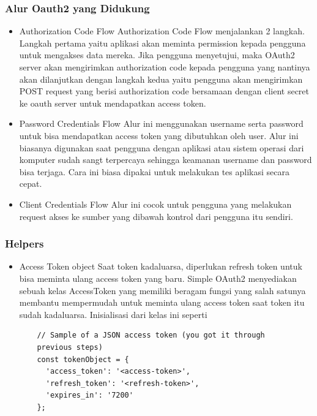 \subsubsection{Alur Oauth2 yang Didukung}
\begin{itemize}
    \item Authorization Code Flow
    Authorization Code Flow menjalankan 2 langkah. Langkah pertama yaitu aplikasi akan meminta permission kepada pengguna untuk mengakses data mereka. Jika pengguna menyetujui, maka OAuth2 server akan mengirimkan authorization code kepada pengguna yang nantinya akan dilanjutkan dengan langkah kedua yaitu pengguna akan mengirimkan POST request yang berisi authorization code bersamaan dengan client secret ke oauth server untuk mendapatkan access token. 
    
    \item Password Credentials Flow
    Alur ini menggunakan username serta password untuk bisa mendapatkan access token yang dibutuhkan oleh user. Alur ini biasanya digunakan saat pengguna dengan aplikasi atau sistem operasi dari komputer sudah sangt terpercaya sehingga keamanan username dan password bisa terjaga. Cara ini biasa dipakai untuk melakukan tes aplikasi secara cepat. 
    
    \item Client Credentials Flow
    Alur ini cocok untuk pengguna yang melakukan request akses ke sumber yang dibawah kontrol dari pengguna itu sendiri. 
\end{itemize}

\subsubsection{Helpers}
\begin{itemize}
    \item Access Token object
    Saat token kadaluarsa, diperlukan refresh token untuk bisa meminta ulang access token yang baru. Simple OAuth2 menyediakan sebuah kelas AccessToken yang memiliki beragam fungsi yang salah satunya membantu mempermudah untuk meminta ulang access token saat token itu sudah kadaluarsa. Inisialisasi dari kelas ini seperti 
    
    \begin{lstlisting}
    // Sample of a JSON access token (you got it through
    previous steps)
    const tokenObject = {
      'access_token': '<access-token>',
      'refresh_token': '<refresh-token>',
      'expires_in': '7200'
    };
    \end{lstlisting}
\end{itemize}

